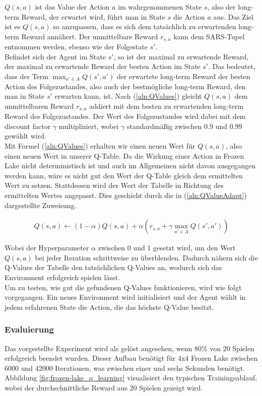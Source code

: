 \documentclass[11pt]{scrartcl}
\begin{document}
\noindent
$Q(s, a)$ ist das Value der Action $a$ im wahrgenommenen State $s$, also der long-term
Reward, der erwartet wird, führt man in State $s$ die Action $a$ aus. Das Ziel ist es
$Q(s, a)$ so anzupassen, dass es sich dem tatsächlich zu erwartenden long-term Reward
annähert. Der unmittelbare Reward $r_{s,a}$ kann dem SARS-Tupel entnommen werden, ebenso
wie der Folgestate $s'$.\\
Befindet sich der Agent im State $s'$, so ist der maximal zu erwartende Reward, der 
maximal zu erwartende Reward der besten Action im State $s'$. Das bedeutet, dass
der Term $\max_{a'\in A} Q(s', a')$ der erwartete long-term Reward der besten Action des
Folgezustandes, also auch der bestmögliche long-term Reward, den man in State $s'$
erwarten kann, ist. Nach (\ref{aln:QValues}) gleicht $Q(s, a)$ dem unmittelbaren Reward
$r_{s,a}$ addiert mit dem besten zu erwartenden long-term Reward des Folgezustandes. Der
Wert des Folgezustandes wird dabei mit dem discount factor $\gamma$ multipliziert, wobei 
$\gamma$ standardmäßig zwischen $0.9$ und $0.99$ gewählt wird.\\
Mit Formel (\ref{aln:QValues}) erhalten wir einen neuen Wert für $Q(s, a)$, also einen
neuen Wert in unserer Q-Table. Da die Wirkung einer Action in Frozen Lake nicht
deterministisch ist und auch im Allgemeinen nicht davon ausgegangen werden kann, wäre es
nicht gut den Wert der Q-Table gleich dem ermittelten Wert zu setzen. Stattdessen wird der
Wert der Tabelle in Richtung des ermittelten Wertes angepasst. Dies geschieht durch die in
(\ref{aln:QValueAdapt}) dargestellte Zuweisung.

\begin{align}
  Q(s, a) \leftarrow (1 - \alpha)Q(s, a) +
  \alpha(r_{s, a} + \gamma \max_{a'\in A}Q(s', a'))
\label{aln:QValueAdapt}
\end{align}

Wobei der Hyperparameter $\alpha$ zwischen 0 und 1 gesetzt wird, um den Wert $Q(s, a)$ bei
jeder Iteration schrittweise zu überblenden. Dadurch nähern sich die Q-Values der Tabelle
den tatsächlichen Q-Values an, wodurch sich das Environment erfolgreich spielen lässt.\\
Um zu testen, wie gut die gefundenen Q-Values funktionieren, wird wie folgt vorgegangen.
Ein neues Environment wird initialisiert und der Agent wählt in jedem erfahrenen State die
Action, die das höchste Q-Value besitzt.


\subsubsection{Evaluierung}
Das vorgestellte Experiment wird als gelöst angesehen, wenn 80\% von 20 Spielen erfolgreich
beendet wurden. Dieser Aufbau benötigt für 4x4 Frozen Lake zwischen 6000 und 42000
Iterationen, was zwischen einer und sechs Sekunden benötigt. Abbildung
\ref{fig:frozen-lake_q_learning} visualisiert den typischen Trainingsablauf, wobei der
durchschnittliche Reward aus 20 Spielen gezeigt wird.
\end{document}
